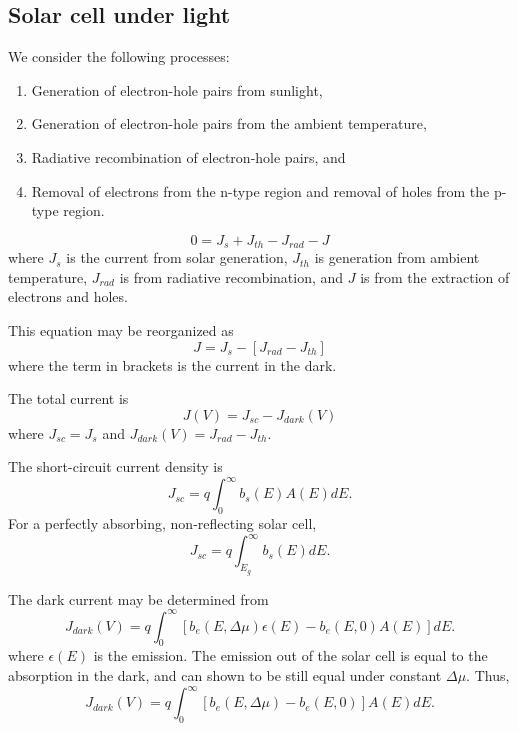 \documentclass[12pt]{article}
\begin{document}
\subsection{Solar cell under light}
We consider the following processes:
\begin{enumerate}
\item Generation of electron-hole pairs from sunlight, 
\item Generation of electron-hole pairs from the ambient temperature,
\item Radiative recombination of electron-hole pairs, and 
\item Removal of electrons from the n-type region and removal of holes from the p-type region.
\end{enumerate}

\begin{equation}
0 = J_s + J_{th} - J_{rad} - J
\end{equation}
where $J_s$ is the current from solar generation, $J_{th}$ is generation from ambient temperature, $J_{rad}$ is from radiative recombination, and $J$ is from the extraction of electrons and holes.  

This equation may be reorganized as 
\begin{equation}
J = J_s - [J_{rad} -J_{th}] 
\end{equation}
where the term in brackets is the current in the dark.  

The total current is 
\begin{equation}
\boxed{J(V) = J_{sc} - J_{dark}(V)}
\end{equation}
where $J_{sc} = J_s$ and $J_{dark}(V) = J_{rad} - J_{th}$.  


The short-circuit current density is 
\begin{equation}
\boxed{J_{sc} = q \int_{0}^{\infty} b_s(E) A(E) dE.}
\end{equation}
For a perfectly absorbing, non-reflecting solar cell,  
\begin{equation}
\boxed{J_{sc} = q \int_{E_g}^{\infty} b_s(E) dE.}
\end{equation}

The dark current may be determined from 
\begin{equation}
J_{dark}(V) = q \int_{0}^{\infty} \left [ b_e (E, \Delta \mu)  \epsilon(E) - b_e (E, 0) A(E) \right ] dE.
\end{equation}
where $\epsilon(E)$ is the emission.  
The emission out of the solar cell is equal to the absorption in the dark, and can shown to be still equal under constant $\Delta \mu$.  
Thus, 
\begin{equation}
\boxed{J_{dark}(V) = q \int_{0}^{\infty} \left [ b_e (E, \Delta \mu) - b_e (E, 0) \right ] A(E) dE.}
\end{equation}
\end{document}

